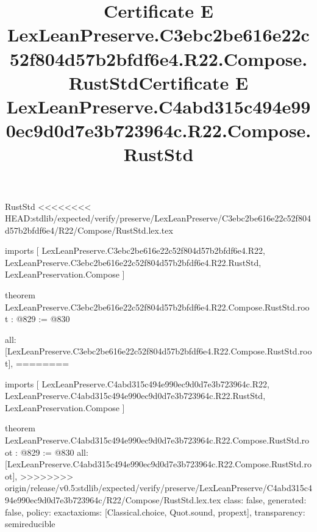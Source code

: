 \begin{lexlean}{RustStd}
<<<<<<<< HEAD:stdlib/expected/verify/preserve/LexLeanPreserve/C3ebc2be616e22c52f804d57b2bfdf6e4/R22/Compose/RustStd.lex.tex
\title{Certificate E LexLeanPreserve.C3ebc2be616e22c52f804d57b2bfdf6e4.R22.Compose.RustStd}
\begin{coremodule}
imports [
  LexLeanPreserve.C3ebc2be616e22c52f804d57b2bfdf6e4.R22,
  LexLeanPreserve.C3ebc2be616e22c52f804d57b2bfdf6e4.R22.RustStd,
  LexLeanPreservation.Compose
]

theorem LexLeanPreserve.C3ebc2be616e22c52f804d57b2bfdf6e4.R22.Compose.RustStd.root : @829 := @830 {
  all: [LexLeanPreserve.C3ebc2be616e22c52f804d57b2bfdf6e4.R22.Compose.RustStd.root],
========
\title{Certificate E LexLeanPreserve.C4abd315c494e990ec9d0d7e3b723964c.R22.Compose.RustStd}
\begin{coremodule}
imports [
  LexLeanPreserve.C4abd315c494e990ec9d0d7e3b723964c.R22,
  LexLeanPreserve.C4abd315c494e990ec9d0d7e3b723964c.R22.RustStd,
  LexLeanPreservation.Compose
]

theorem LexLeanPreserve.C4abd315c494e990ec9d0d7e3b723964c.R22.Compose.RustStd.root : @829 := @830 {
  all: [LexLeanPreserve.C4abd315c494e990ec9d0d7e3b723964c.R22.Compose.RustStd.root],
>>>>>>>> origin/release/v0.5:stdlib/expected/verify/preserve/LexLeanPreserve/C4abd315c494e990ec9d0d7e3b723964c/R22/Compose/RustStd.lex.tex
  class: false,
  generated: false,
  policy: exact{axioms: [Classical.choice, Quot.sound, propext]},
  transparency: semireducible
}


\end{coremodule}}
\end{coremodule}
\end{lexlean}
